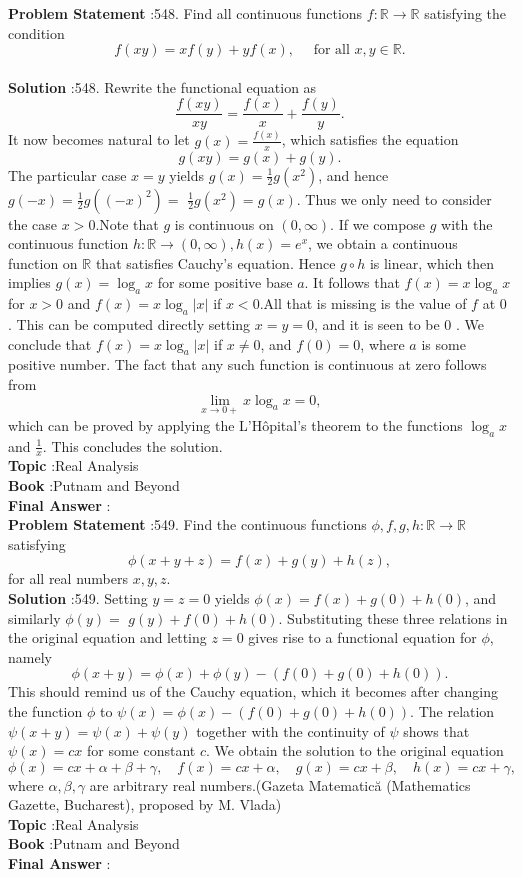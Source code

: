 \documentclass[10pt]{article}
\begin{document}
\textbf{Problem Statement} :548. Find all continuous functions $f: \mathbb{R} \rightarrow \mathbb{R}$ satisfying the condition$$ f(x y)=x f(y)+y f(x), \quad \text { for all } x, y \in \mathbb{R} . $$\\
\textbf{Solution} :548. Rewrite the functional equation as$$ \frac{f(x y)}{x y}=\frac{f(x)}{x}+\frac{f(y)}{y} . $$It now becomes natural to let $g(x)=\frac{f(x)}{x}$, which satisfies the equation$$ g(x y)=g(x)+g(y) . $$The particular case $x=y$ yields $g(x)=\frac{1}{2} g\left(x^{2}\right)$, and hence $g(-x)=\frac{1}{2} g\left((-x)^{2}\right)=$ $\frac{1}{2} g\left(x^{2}\right)=g(x)$. Thus we only need to consider the case $x>0$.Note that $g$ is continuous on $(0, \infty)$. If we compose $g$ with the continuous function $h: \mathbb{R} \rightarrow(0, \infty), h(x)=e^{x}$, we obtain a continuous function on $\mathbb{R}$ that satisfies Cauchy's equation. Hence $g \circ h$ is linear, which then implies $g(x)=\log _{a} x$ for some positive base $a$. It follows that $f(x)=x \log _{a} x$ for $x>0$ and $f(x)=x \log _{a}|x|$ if $x<0$.All that is missing is the value of $f$ at 0 . This can be computed directly setting $x=y=0$, and it is seen to be 0 . We conclude that $f(x)=x \log _{a}|x|$ if $x \neq 0$, and $f(0)=0$, where $a$ is some positive number. The fact that any such function is continuous at zero follows from$$ \lim _{x \rightarrow 0+} x \log _{a} x=0, $$which can be proved by applying the L'Hôpital's theorem to the functions $\log _{a} x$ and $\frac{1}{x}$. This concludes the solution.\\
\textbf{Topic} :Real Analysis\\
\textbf{Book} :Putnam and Beyond\\
\textbf{Final Answer} :\\


\textbf{Problem Statement} :549. Find the continuous functions $\phi, f, g, h: \mathbb{R} \rightarrow \mathbb{R}$ satisfying$$ \phi(x+y+z)=f(x)+g(y)+h(z), $$for all real numbers $x, y, z$.\\
\textbf{Solution} :549. Setting $y=z=0$ yields $\phi(x)=f(x)+g(0)+h(0)$, and similarly $\phi(y)=$ $g(y)+f(0)+h(0)$. Substituting these three relations in the original equation and letting $z=0$ gives rise to a functional equation for $\phi$, namely$$ \phi(x+y)=\phi(x)+\phi(y)-(f(0)+g(0)+h(0)) . $$This should remind us of the Cauchy equation, which it becomes after changing the function $\phi$ to $\psi(x)=\phi(x)-(f(0)+g(0)+h(0))$. The relation $\psi(x+y)=\psi(x)+\psi(y)$ together with the continuity of $\psi$ shows that $\psi(x)=c x$ for some constant $c$. We obtain the solution to the original equation$$ \phi(x)=c x+\alpha+\beta+\gamma, \quad f(x)=c x+\alpha, \quad g(x)=c x+\beta, \quad h(x)=c x+\gamma, $$where $\alpha, \beta, \gamma$ are arbitrary real numbers.(Gazeta Matematică (Mathematics Gazette, Bucharest), proposed by M. Vlada)\\
\textbf{Topic} :Real Analysis\\
\textbf{Book} :Putnam and Beyond\\
\textbf{Final Answer} :\\
\end{document}
